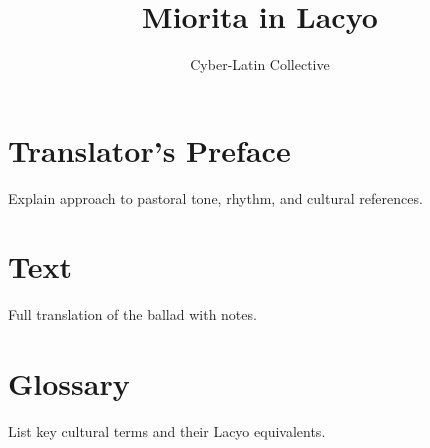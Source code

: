 \documentclass[12pt]{book}
\title{Miorita in Lacyo}
\author{Cyber-Latin Collective}
\date{}
\begin{document}
\maketitle
\tableofcontents

\chapter{Translator's Preface}
Explain approach to pastoral tone, rhythm, and cultural references.

\chapter{Text}
Full translation of the ballad with notes.

\chapter{Glossary}
List key cultural terms and their Lacyo equivalents.
\end{document}

